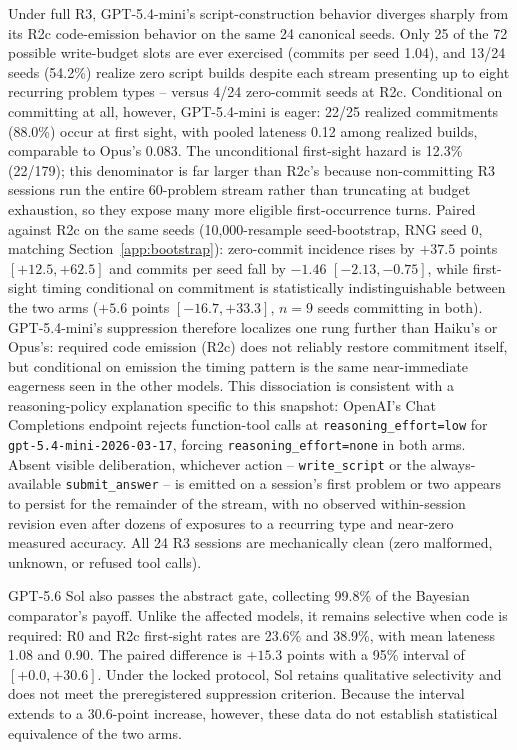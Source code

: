 \documentclass{article}
\begin{document}
Under full R3, GPT-5.4-mini's script-construction behavior diverges sharply
from its R2c code-emission behavior on the same 24 canonical seeds. Only 25 of
the 72 possible write-budget slots are ever exercised (commits per seed 1.04),
and 13/24 seeds (54.2\%) realize zero script builds despite each stream
presenting up to eight recurring problem types -- versus 4/24 zero-commit
seeds at R2c. Conditional on committing at all, however, GPT-5.4-mini is
eager: 22/25 realized commitments (88.0\%) occur at first sight, with pooled
lateness 0.12 among realized builds, comparable to Opus's 0.083. The
unconditional first-sight hazard is 12.3\% (22/179); this denominator is far
larger than R2c's because non-committing R3 sessions run the entire
60-problem stream rather than truncating at budget exhaustion, so they expose
many more eligible first-occurrence turns. Paired against R2c on the same
seeds (10,000-resample seed-bootstrap, RNG seed 0, matching
Section~\ref{app:bootstrap}): zero-commit incidence rises by $+37.5$ points
$[+12.5,+62.5]$ and commits per seed fall by $-1.46$ $[-2.13,-0.75]$, while
first-sight timing conditional on commitment is statistically indistinguishable
between the two arms ($+5.6$ points $[-16.7,+33.3]$, $n=9$ seeds committing in
both). GPT-5.4-mini's suppression therefore localizes one rung further than
Haiku's or Opus's: required code emission (R2c) does not reliably restore
commitment itself, but conditional on emission the timing pattern is the same
near-immediate eagerness seen in the other models. This dissociation is
consistent with a reasoning-policy explanation specific to this snapshot:
OpenAI's Chat Completions endpoint rejects function-tool calls at
\texttt{reasoning\_effort=low} for \texttt{gpt-5.4-mini-2026-03-17}, forcing
\texttt{reasoning\_effort=none} in both arms. Absent visible deliberation,
whichever action -- \texttt{write\_script} or the always-available
\texttt{submit\_answer} -- is emitted on a session's first problem or two
appears to persist for the remainder of the stream, with no observed
within-session revision even after dozens of exposures to a recurring type
and near-zero measured accuracy. All 24 R3 sessions are mechanically clean
(zero malformed, unknown, or refused tool calls).

GPT-5.6 Sol also passes the abstract gate, collecting 99.8\% of the Bayesian
comparator's payoff. Unlike the affected models, it
remains selective when code
is required: R0 and R2c first-sight rates are 23.6\% and 38.9\%, with mean
lateness 1.08 and 0.90. The paired difference is $+15.3$ points with a 95\%
interval of $[+0.0,+30.6]$. Under the locked protocol, Sol retains qualitative
selectivity and does not meet the preregistered suppression criterion. Because
the interval extends to a 30.6-point increase, however, these data do not
establish statistical equivalence of the two arms.
\end{document}
